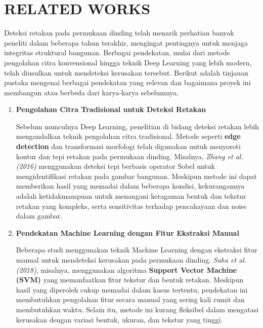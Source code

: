 \documentclass[12pt,a4paper]{article}
\begin{document}
\section{RELATED WORKS}
\begin{adjustwidth}{3em}{0pt} 
\hspace{0.5cm} Deteksi retakan pada permukaan dinding telah menarik perhatian banyak peneliti dalam beberapa tahun terakhir, mengingat pentingnya untuk menjaga integritas struktural bangunan. Berbagai pendekatan, mulai dari metode pengolahan citra konvensional hingga teknik Deep Learning yang lebih modern, telah diusulkan untuk mendeteksi kerusakan tersebut. Berikut adalah tinjauan pustaka mengenai berbagai pendekatan yang relevan dan bagaimana proyek ini membangun atau berbeda dari karya-karya sebelumnya.

\begin{enumerate}
    \item \textbf{Pengolahan Citra Tradisional untuk Deteksi Retakan}
    
    \hspace{0.5cm} Sebelum munculnya Deep Learning, penelitian di bidang deteksi retakan lebih mengandalkan teknik pengolahan citra tradisional. Metode seperti \textbf{edge detection} dan transformasi morfologi telah digunakan untuk menyoroti kontur dan tepi retakan pada permukaan dinding. Misalnya, \textit{Zhang et al. (2016)} menggunakan deteksi tepi berbasis operator Sobel untuk mengidentifikasi retakan pada gambar bangunan. Meskipun metode ini dapat memberikan hasil yang memadai dalam beberapa kondisi, kekurangannya adalah ketidakmampuan untuk menangani keragaman bentuk dan tekstur retakan yang kompleks, serta sensitivitas terhadap pencahayaan dan noise dalam gambar.

    \item \textbf{Pendekatan Machine Learning dengan Fitur Ekstraksi Manual}
    
    \hspace{0.5cm} Beberapa studi menggunakan teknik Machine Learning dengan ekstraksi fitur manual untuk mendeteksi kerusakan pada permukaan dinding. \textit{Saha et al. (2018)}, misalnya, menggunakan algoritma \textbf{Support Vector Machine (SVM)} yang memanfaatkan fitur tekstur dan bentuk retakan. Meskipun hasil yang diperoleh cukup memadai dalam kasus tertentu, pendekatan ini membutuhkan pengolahan fitur secara manual yang sering kali rumit dan membutuhkan waktu. Selain itu, metode ini kurang fleksibel dalam mengatasi kerusakan dengan variasi bentuk, ukuran, dan tekstur yang tinggi.


\end{enumerate}
\end{adjustwidth}
\end{document}
